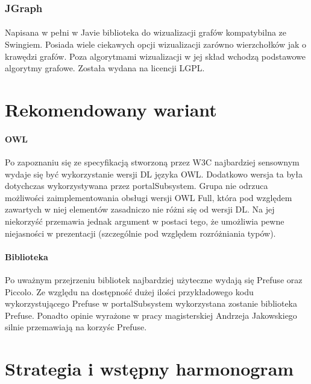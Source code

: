 \documentclass[a4paper,10pt]{article}
\begin{document}
\subsubsection{JGraph}
\paragraph{} Napisana w pełni w Javie biblioteka do wizualizacji grafów kompatybilna ze Swingiem. Posiada wiele ciekawych opcji wizualizacji zarówno wierzchołków jak o krawędzi grafów. Poza algorytmami wizualizacji w jej skład wchodzą podstawowe algorytmy grafowe. Została wydana na licencji LGPL.


\section{Rekomendowany wariant}


\paragraph{OWL} Po zapoznaniu się ze specyfikacją stworzoną przez W3C najbardziej sensownym wydaje się być wykorzystanie wersji DL języka OWL. Dodatkowo wersja ta była dotychczas wykorzystywana przez portalSubsystem. Grupa nie odrzuca możliwości zaimplementowania obsługi wersji OWL Full, która pod względem zawartych w niej elementów zasadniczo nie różni się od wersji DL. Na jej niekorzyść przemawia jednak argument w postaci tego, że umożliwia pewne niejasności w prezentacji (szczególnie pod względem rozróżniania typów).

\paragraph{Biblioteka }Po uważnym przejrzeniu bibliotek najbardziej użyteczne wydają się Prefuse oraz Piccolo. Ze względu na dostępność dużej ilości przykładowego kodu wykorzystującego Prefuse w portalSubsystem wykorzystana zostanie biblioteka Prefuse. Ponadto opinie wyrażone w pracy magisterskiej Andrzeja Jakowskiego silnie przemawiają na korzyśc Prefuse.


\section{Strategia i wstępny harmonogram}
\end{document}

